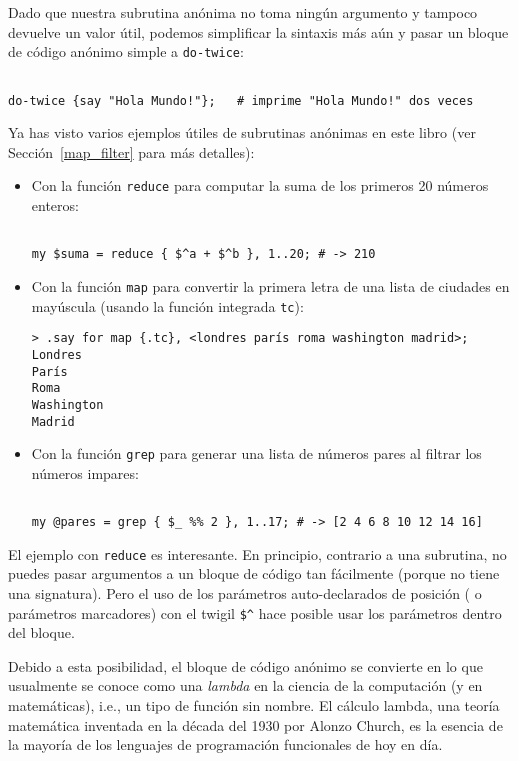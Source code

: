 Dado que nuestra subrutina anónima no toma ningún argumento
y tampoco devuelve un valor útil, podemos simplificar la
sintaxis más aún y pasar un bloque de código anónimo simple
a {\tt do-twice}:

\begin{verbatim}

do-twice {say "Hola Mundo!"};   # imprime "Hola Mundo!" dos veces
\end{verbatim}

Ya has visto varios ejemplos útiles de subrutinas anónimas en este
libro (ver Sección~\ref{map_filter} para más detalles):
\begin{itemize}
\item Con la función {\tt reduce} para computar la suma de 
los primeros 20 números enteros:
\begin{verbatim}

my $suma = reduce { $^a + $^b }, 1..20; # -> 210
\end{verbatim}
\item Con la función {\tt map} para convertir la primera
letra de una lista de ciudades en mayúscula (usando la función
integrada {\tt tc}):
\begin{verbatim}
> .say for map {.tc}, <londres parís roma washington madrid>;
Londres
París
Roma
Washington
Madrid
\end{verbatim}
\item Con la función {\tt grep} para generar una lista de números 
pares al filtrar los números impares:
\begin{verbatim}

my @pares = grep { $_ %% 2 }, 1..17; # -> [2 4 6 8 10 12 14 16]
\end{verbatim}
\end{itemize} 

El ejemplo con {\tt reduce} es interesante. En principio, 
contrario a una subrutina, no puedes pasar argumentos a un
bloque de código tan fácilmente (porque no tiene una signatura).
Pero el uso de los parámetros auto-declarados de posición (
o parámetros marcadores) con el twigil \verb|$^| hace posible
usar los parámetros dentro del bloque. 

Debido a esta posibilidad, el bloque de código anónimo se convierte
en lo que usualmente se conoce como una \emph{lambda} en la 
ciencia de la computación (y en matemáticas), i.e., un tipo de
función sin nombre. El cálculo lambda, una teoría matemática 
inventada en la década del 1930 por Alonzo Church, es la esencia
de la mayoría de los lenguajes de programación funcionales de
hoy en día.

